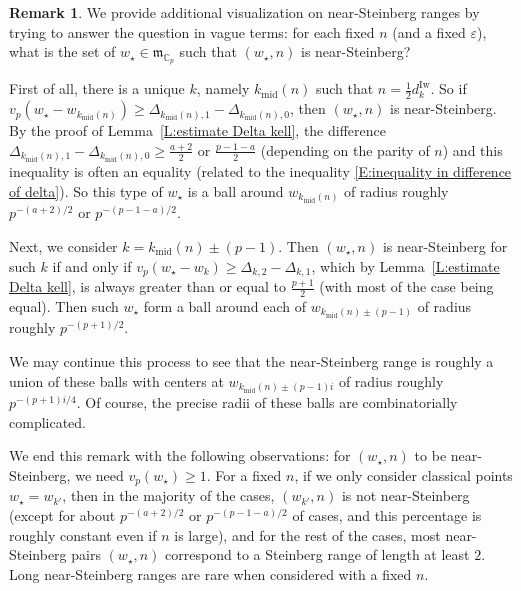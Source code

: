 \documentclass[12pt]{amsart}
\theoremstyle{definition}
\newtheorem{remark}[subsection]{Remark}
\numberwithin{equation}{subsection}
\def\gothm{\mathfrak{m}}
\def\CC{\mathbb{C}}
\newcommand{\Iw}{\mathrm{Iw}}
\newcommand{\midd}{\mathrm{mid}}
\begin{document}
\begin{remark}
\label{R:intuition of near-Steinberg}
We provide additional visualization on near-Steinberg ranges by trying to answer the question in vague terms: for each fixed $n$ (and a fixed $\varepsilon$), what is the set of $w_\star \in \gothm_{\CC_p}$ such that $(w_\star, n)$ is near-Steinberg?

First of all, there is a unique $k$, namely $k_{\midd}(n)$ such that $n = \frac 12 d_k^\Iw$. So if $v_p(w_\star- w_{k_\midd(n)}) \geq \Delta_{k_\midd(n), 1}-\Delta_{k_\midd(n), 0}$, then $(w_\star, n)$ is near-Steinberg. By the proof of Lemma~\ref{L:estimate Delta kell}, the difference $\Delta_{k_\midd(n), 1}-\Delta_{k_\midd(n), 0} \geq \frac{a+2}2$ or $\frac{p-1-a}2$ (depending on the parity of $n$) and this inequality is often an equality (related to the inequality \eqref{E:inequality in difference of delta}). So this type of $w_\star$ is a ball around $w_{k_\midd(n)}$ of radius roughly $p^{-(a+2)/2}$ or $p^{-(p-1-a)/2}$.

Next, we consider $k = k_\midd(n) \pm (p-1)$. Then $(w_\star, n)$ is near-Steinberg for such $k$ if and only if $v_p(w_\star- w_{k}) \geq \Delta_{k, 2}-\Delta_{k, 1}$, which by Lemma~\ref{L:estimate Delta kell}, is always greater than or equal to $\frac{p+1}2$ (with most of the case being equal). Then such $w_\star$ form a ball around each of $w_{k_\midd(n)\pm (p-1)}$ of radius roughly $p^{-(p+1)/2}$.

We may continue this process to see that the near-Steinberg range is roughly a union of these balls with centers at $w_{k_\midd(n)\pm (p-1)i}$ of radius roughly $p^{-(p+1)i/4}$. Of course, the precise radii of these balls are combinatorially complicated.  

We end this remark with the following observations: for $(w_\star, n)$ to be near-Steinberg, we need $v_p(w_\star) \geq 1$. For a fixed $n$, if we only consider classical points  $w_\star = w_{k'}$, then in the majority of the cases, $(w_{k'},n)$ is not near-Steinberg (except for about $p^{-(a+2)/2}$ or $p^{-(p-1-a)/2}$ of cases, and this percentage is roughly constant even if $n$ is large), and for the rest of the cases, most near-Steinberg pairs $(w_\star, n)$ correspond to a Steinberg range of length at least $2$. Long near-Steinberg ranges are rare when considered with a fixed $n$.
\end{remark}
\end{document}
